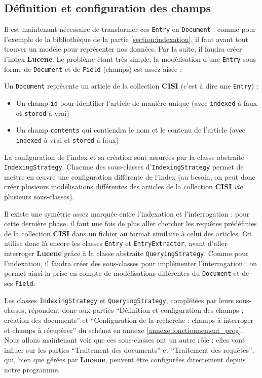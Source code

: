 \subsection{Définition et configuration des champs}

Il est maintenant nécessaire de transformer ces \texttt{Entry} en \texttt{Document} : comme pour l’exemple de la bibliothèque de la partie \ref{section:indexation}, il faut avant tout trouver un modèle pour représenter nos données. Par la suite, il faudra créer l’index \textbf{Lucene}.
Le problème étant très simple, la modélisation d’une \texttt{Entry} sous forme de \texttt{Document} et de \texttt{Field} (champs) est assez aisée :

Un \texttt{Document} représente un article de la collection \textbf{CISI} (c’est à dire une \texttt{Entry}) :
\begin{itemize}
\item Un champ \texttt{id} pour identifier l’article de manière unique (avec \texttt{indexed} à faux et \texttt{stored} à vrai)
\item Un champ \texttt{contents} qui contiendra le nom et le contenu de l’article (avec \texttt{indexed} à vrai et \texttt{stored} à faux)\\
\end{itemize}

La configuration de l’index et sa création sont assurées par la classe abstraite \texttt{IndexingStrategy}. Chacune des sous-classes d’\texttt{IndexingStrategy} permet de mettre en œuvre une configuration différente de l’index (au besoin, on peut donc créer plusieurs modélisations différentes des articles de la collection \textbf{CISI} \textit{via} plusieurs sous-classes).

Il existe une symétrie assez marquée entre l’indexation et l’interrogation : pour cette dernière phase, il faut une fois de plus aller chercher les requêtes prédéfinies de la collection \textbf{CISI} dans un fichier au format similaire à celui des articles. On utilise donc là encore les classes \texttt{Entry} et \texttt{EntryExtractor}, avant d’aller interroger \textbf{Lucene} grâce à la classe abstraite \texttt{QueryingStrategy}. Comme pour l’indexation, il faudra créer des sous-classes pour implémenter l’interrogation : on permet ainsi la prise en compte de modélisations différentes du \texttt{Document} et de ses \texttt{Field}.

Les classes \texttt{IndexingStrategy} et \texttt{QueryingStrategy}, complétées par leurs sous-classes, répondent donc aux parties “Définition et configuration des champs ; création des documents” et “Configuration de la recherche : champs à interroger et champs à récupérer” du schéma en annexe \ref{annexe:fonctionnement_prog}. Nous allons maintenant voir que ces sous-classes ont un autre rôle : elles vont influer sur les parties “Traitement des documents” et “Traitement des requêtes”, qui, bien que gérées par \textbf{Lucene}, peuvent être configurées directement depuis notre programme.

